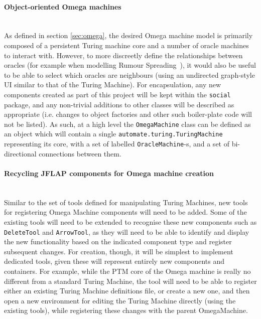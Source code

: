 \documentclass[12pt]{article}
\begin{document}
		\paragraph{Object-oriented Omega machines}\hfill\\
			As defined in section \ref{sec:omega}, the desired Omega machine model is primarily composed of a persistent Turing machine core and a number of oracle machines to interact with.
			However, to more discreetly define the relationships between oracles (for example when modelling Rumour Spreading~\cite{Zhang2014}), it would also be useful to be able to select which oracles are neighbours (using an undirected graph-style UI similar to that of the Turing Machine).
			For encapsulation, any new components created as part of this project will be kept within the \texttt{social} package, and any non-trivial additions to other classes will be described as appropriate (i.e. changes to object factories and other such boiler-plate code will not be listed).
			As such, at a high level the \texttt{OmegaMachine} class can be defined as an object which will contain a single \texttt{automate.turing.TuringMachine} representing its core, with a set of labelled \texttt{OracleMachine}-s, and a set of bi-directional connections between them.
		\paragraph{Recycling JFLAP components for Omega machine creation}\hfill\\
			Similar to the set of tools defined for manipulating Turing Machines, new tools for registering Omega Machine components will need to be added.
			Some of the existing tools will need to be extended to recognise these new components such as \texttt{DeleteTool} and \texttt{ArrowTool}, as they will need to be able to identify and display the new functionality based on the indicated component type and register subsequent changes.
			For creation, though, it will be simplest to implement dedicated tools, given these will represent entirely new components and containers.
			For example, while the PTM core of the Omega machine is really no different from a standard Turing Machine, the tool will need to be able to register either an existing Turing Machine definitions file, or create a new one, and then open a new environment for editing the Turing Machine directly (using the existing tools), while registering these changes with the parent OmegaMachine.
\end{document}
